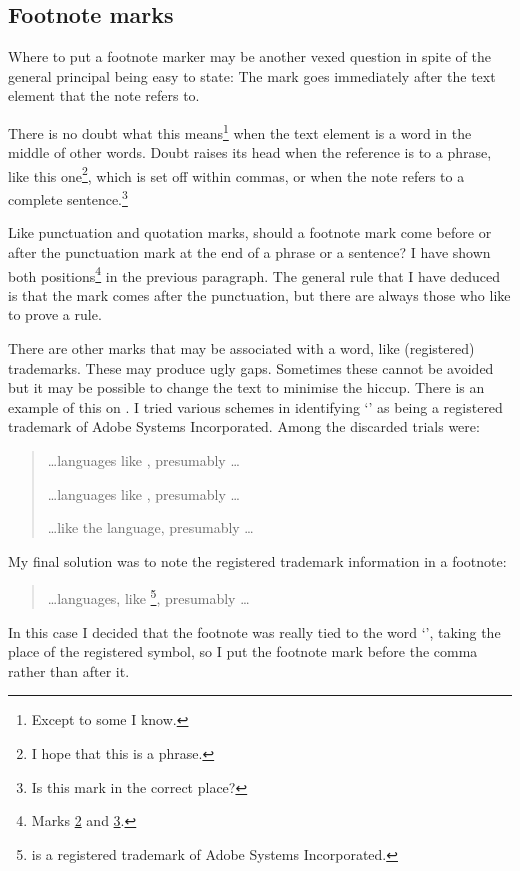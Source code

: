 \documentclass[10pt,a4paper,oneside,extrafontsizes]{memoir}%
\begin{document}
\subsection{Footnote marks}

\begin{paracol}{2}
\switchEng
    Where to put a footnote marker may be another vexed question in spite
of the general principal being easy to state: The mark goes immediately
after the text element that the note refers to.

    There is no doubt what this means\footnote{Except to some I know.} when
the text element is a word in the middle of other words. Doubt raises
its head when the reference is to a phrase, like this one\footnote{I hope
that this is a phrase.\label{fn:phrase}}, 
which is set off within commas, or when the note refers to a complete 
sentence.\footnote{Is this mark in the correct place?\label{fn:sentence}}

    Like punctuation and quotation marks, 
should a footnote mark come before
or after the punctuation mark at the end of a phrase or a sentence? I have
shown both positions\footnote{Marks \ref{fn:phrase} and \ref{fn:sentence}.}
 in the previous paragraph. The 
general rule that I have deduced is that the mark comes after the 
punctuation, but there are always those who like to prove a rule.
\end{paracol}

\begin{paracol}{2}
\switchEng
   There are other marks that may be associated with a word, like 
(registered) trademarks. These may produce ugly gaps. Sometimes these
cannot be avoided but it may be possible to change the text to minimise
the hiccup. There is an example of this on . I tried various
schemes in identifying `\pscript' as being a registered trademark of
Adobe Systems Incorporated. Among the discarded trials were:
\begin{quote}
\ldots languages like \pscript\texttrademark, presumably \ldots

\ldots languages like \pscript\textsuperscript{\textregistered}, presumably \ldots

\ldots like the \pscript\textsuperscript{\textregistered}{} language, presumably \ldots

\end{quote}
My final solution was to note the registered trademark information in
a footnote:
\begin{quote}
\ldots languages, like \pscript\footnote{\pscript{} is a registered 
trademark of Adobe Systems Incorporated.}, presumably \ldots
\end{quote}
In this case I decided that the footnote was really tied to the word
`\pscript', taking the place of the registered symbol, so I put the
footnote mark before the comma rather than after it.
\end{paracol}
\end{document}
